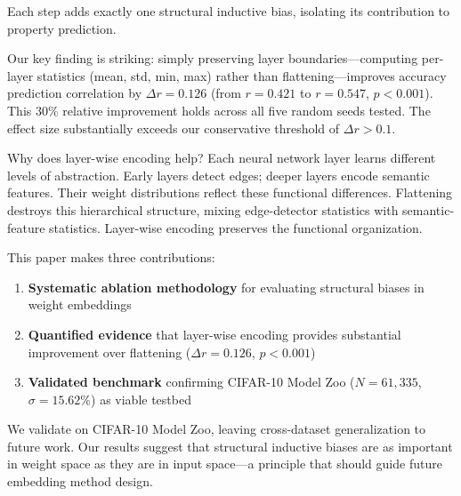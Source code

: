 Each step adds exactly one structural inductive bias, isolating its contribution to property prediction.

Our key finding is striking: simply preserving layer boundaries---computing per-layer statistics (mean, std, min, max) rather than flattening---improves accuracy prediction correlation by $\Delta r = 0.126$ (from $r = 0.421$ to $r = 0.547$, $p < 0.001$). This 30\% relative improvement holds across all five random seeds tested. The effect size substantially exceeds our conservative threshold of $\Delta r > 0.1$.

Why does layer-wise encoding help? Each neural network layer learns different levels of abstraction. Early layers detect edges; deeper layers encode semantic features. Their weight distributions reflect these functional differences. Flattening destroys this hierarchical structure, mixing edge-detector statistics with semantic-feature statistics. Layer-wise encoding preserves the functional organization.

This paper makes three contributions:

\begin{enumerate}
    \item \textbf{Systematic ablation methodology} for evaluating structural biases in weight embeddings
    \item \textbf{Quantified evidence} that layer-wise encoding provides substantial improvement over flattening ($\Delta r = 0.126$, $p < 0.001$)
    \item \textbf{Validated benchmark} confirming CIFAR-10 Model Zoo ($N = 61{,}335$, $\sigma = 15.62\%$) as viable testbed
\end{enumerate}

We validate on CIFAR-10 Model Zoo, leaving cross-dataset generalization to future work. Our results suggest that structural inductive biases are as important in weight space as they are in input space---a principle that should guide future embedding method design.
